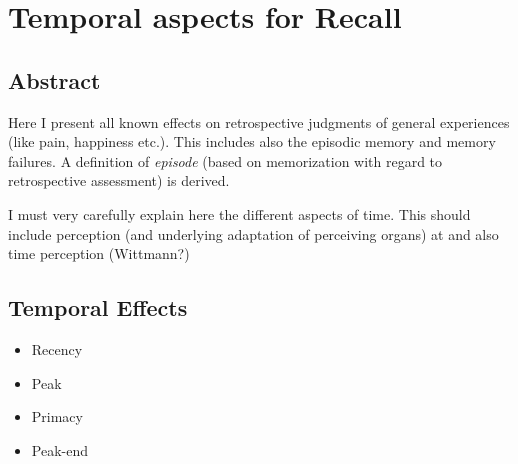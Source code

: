 \chapter{Temporal aspects for Recall}\label{chap:03}
\section*{Abstract}
Here I present all known effects on retrospective judgments of general experiences (like pain, happiness etc.).
This includes also the episodic memory and memory failures.
A definition of \emph{episode} (based on memorization with regard to retrospective assessment) is derived.

I must very carefully explain here the different aspects of time.
This should include perception (and underlying adaptation of perceiving organs) at and also time perception (Wittmann?)

\section{Temporal Effects}
\begin{itemize}
\item Recency
\item Peak
\item Primacy
\item Peak-end
\end{itemize}

